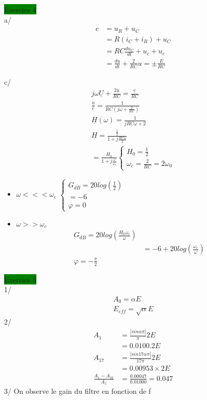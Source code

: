 \documentclass[a4paper,twocolumn,landscape]{article}
\begin{document}
\noindent \colorbox{green}{Exercice 4}\\
a/
\begin{align*}
    e &= u_R + u_C\\
    &= R(i_C + i_R) + u_C\\
    &= RC \frac{du_C}{dt} + u_c + u_c\\
    &= \frac{du}{dt} + \frac{2}{RC}u = \pm \frac{E}{RC}
\end{align*}

c/ \begin{align*}
    j\omega \underline{U} + \frac{2\underline{u}}{RC} = \frac{\underline{e}}{RC}\\
    \frac{\underline{u}}{\underline{e}} = \frac{1}{RC(j\omega + \frac{2}{RC})} \\
    \underline{H}(\omega) = \frac{1}{jRC\omega + 2}\\
    \underline{H} = \frac{\frac{1}{2}}{1 + j\frac{RC\omega}{2}}\\
    = \frac{H_0}{1 + j\frac{\omega}{\omega_c}} \begin{cases}
        H_0 = \frac{1}{2}\\
        \omega_c = \frac{2}{RC} = 2 \omega_0
    \end{cases}
\end{align*}
\begin{itemize}
    \item \(\omega <<< \omega_c\) \begin{math}
        \begin{cases}
            G_{dB} = 20log(\frac{1}{2})\\
            = -6\\
            \varphi = 0
        \end{cases}
    \end{math}
    \item \(\omega >> \omega_c\)\begin{align*}
        G_{dB} = 20log(\frac{H_0\omega_c}{\omega})\\
        &= -6 + 20log(\frac{\omega_c}{\omega})\\
        \varphi = -\frac{\pi}{2}
    \end{align*}
\end{itemize}

\noindent
\colorbox{green}{Exercice 5}\\
1/ \begin{eqnarray*}
    A_0 = \alpha E \\
    E_{eff} = \sqrt{\alpha} E
\end{eqnarray*}
2/ \begin{align*}
    A_1 &= \frac{|sin\alpha\pi|}{\pi} 2 E\\
    &= 0.0100.2E\\
    A_{17} &= \frac{|sin17\alpha\pi|}{17\pi} 2E\\
    &= 0.00953\times 2E\\
    \frac{A_1-A_{17}}{A_1} &= \frac{0.00047}{0.01000} = 0.047
\end{align*}
3/ On observe le gain du filtre en fonction de f\\
\end{document}
